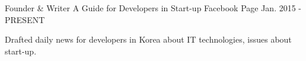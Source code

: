
\begin{cventries}

  \cventry
  {Founder \& Writer} %
  {A Guide for Developers in Start-up} %
  {Facebook Page} %
  {Jan. 2015 - PRESENT} %
  {
    \begin{cvitems} %
    \item {Drafted daily news for developers in Korea about IT technologies, issues about start-up.}
    \end{cvitems}
  }

\end{cventries}
